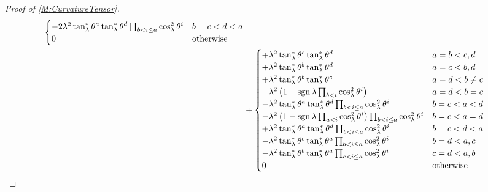 \documentclass[../methodology.tex]{subfiles}
\begin{document}
\begin{proof}[Proof of \cref{M:CurvatureTensor}]
\begin{align*}
\begin{cases}
          -2\lambda^2\tan_\lambda^\ast\tensor{\theta}{^a}\tan_\lambda^\ast\tensor{\theta}{^d}\prod_{b<i\le a}{\cos_\lambda^2\tensor{\theta}{^i}} & \text{\(b=c<d<a\)} \\
          0                                                                                                                                      & \text{otherwise}   \\
        \end{cases}                     \\
     & +\begin{cases}
          +\lambda^2\tan_\lambda^\ast\tensor{\theta}{^c}\tan_\lambda^\ast\tensor{\theta}{^d}
            & \text{\(a=b<c,d\)}    \\
          +\lambda^2\tan_\lambda^\ast\tensor{\theta}{^b}\tan_\lambda^\ast\tensor{\theta}{^d}
            & \text{\(a=c<b,d\)}    \\
          +\lambda^2\tan_\lambda^\ast\tensor{\theta}{^b}\tan_\lambda^\ast\tensor{\theta}{^c}
            & \text{\(a=d<b\ne c\)} \\
          -\lambda^2
          \left(
          1-\sign{\lambda}\prod_{b<i}\cos_\lambda^2\tensor{\theta}{^i}
          \right)
            & \text{\(a=d<b=c\)}    \\
          -\lambda^2\tan_\lambda^\ast\tensor{\theta}{^a}\tan_\lambda^\ast\tensor{\theta}{^d}\prod_{b<i\le a}\cos_\lambda^2\tensor{\theta}{^i}
            & \text{\(b=c<a<d\)}    \\
          -\lambda^2
          \left(
          1-\sign{\lambda}\prod_{a<i}\cos_\lambda^2\tensor{\theta}{^i}
          \right)
          \prod_{b<i\le a}\cos_\lambda^2\tensor{\theta}{^i}
            & \text{\(b=c<a=d\)}    \\
          +\lambda^2\tan_\lambda^\ast\tensor{\theta}{^a}\tan_\lambda^\ast\tensor{\theta}{^d}\prod_{b<i\le a}\cos_\lambda^2\tensor{\theta}{^i}
            & \text{\(b=c<d<a\)}    \\
          -\lambda^2\tan_\lambda^\ast\tensor{\theta}{^c}\tan_\lambda^\ast\tensor{\theta}{^a}\prod_{b<i\le a}\cos_\lambda^2\tensor{\theta}{^i}
            & \text{\(b=d<a,c\)}    \\
          -\lambda^2\tan_\lambda^\ast\tensor{\theta}{^b}\tan_\lambda^\ast\tensor{\theta}{^a}\prod_{c<i\le a}\cos_\lambda^2\tensor{\theta}{^i}
            & \text{\(c=d<a,b\)}    \\
          0 & \text{otherwise}      \\
        \end{cases}                                                  \\

\end{align*}
\end{proof}
\end{document}
